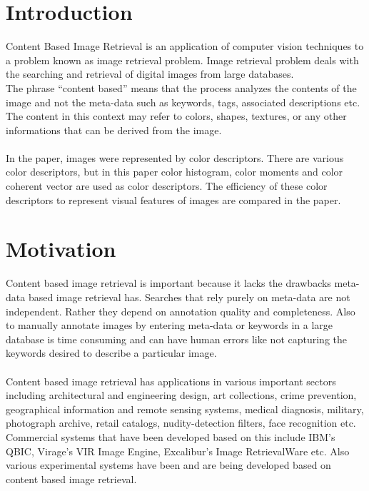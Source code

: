 \documentclass[pstricks,10pt]{report}
\begin{document}
\section{Introduction}

Content Based Image Retrieval  is an application of computer vision 
techniques to a problem known as image retrieval problem. Image retrieval 
problem deals with the searching and retrieval of digital images from 
large databases.\\
\newline
The phrase “content based” means that the process analyzes the contents 
of the image and not the meta-data such as keywords, tags, associated 
descriptions etc. The content in this context may refer to colors, 
shapes, textures, or any other informations that can be derived from the image.\\
\\
In the paper, images were represented by color descriptors. There are 
various color descriptors, but in this paper color histogram, color 
moments and color coherent vector are used as color descriptors. The 
efficiency of these color descriptors to represent visual features of 
images are compared in the paper. 

\section{Motivation}
Content based image retrieval is important because it lacks the drawbacks meta-data based image retrieval has. Searches that rely purely on meta-data are not independent. Rather they depend on annotation quality and completeness. Also to manually annotate images by entering meta-data  or keywords in a large database is time consuming and can have human errors like not capturing the keywords desired to describe a particular image.\\
\\
Content based image retrieval has applications in various important sectors including architectural and engineering design, art collections, crime prevention, geographical information and remote sensing systems, medical diagnosis, military, photograph archive, retail catalogs, nudity-detection filters, face recognition etc. Commercial systems that have been developed based on this include IBM’s QBIC, Virage’s VIR Image Engine, Excalibur’s Image RetrievalWare etc. Also various experimental systems have been and are being developed based on content based image retrieval.
\end{document}
